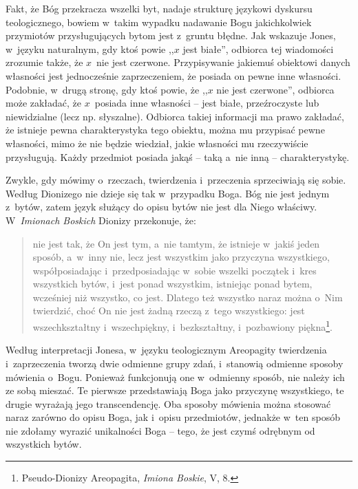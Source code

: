 Fakt, że Bóg przekracza wszelki byt, nadaje strukturę językowi dyskursu teologicznego, bowiem w~takim wypadku nadawanie Bogu jakichkolwiek przymiotów przysługujących bytom jest z~gruntu błędne. Jak wskazuje Jones, w~języku naturalnym, gdy ktoś powie ,,$x$ jest białe'', odbiorca tej wiadomości zrozumie także, że $x$~nie jest czerwone. Przypisywanie jakiemuś obiektowi danych własności jest jednocześnie zaprzeczeniem, że posiada on pewne inne własności. Podobnie, w~drugą stronę, gdy ktoś powie, że ,,$x$ nie jest czerwone'', odbiorca może zakładać, że $x$~posiada inne własności -- jest białe, przeźroczyste lub niewidzialne (lecz np. słyszalne). Odbiorca takiej informacji ma prawo zakładać, że istnieje pewna charakterystyka tego obiektu, można mu przypisać pewne własności, mimo że nie będzie wiedział, jakie własności mu rzeczywiście przysługują. Każdy przedmiot posiada jakąś -- taką a~nie inną -- charakterystykę.

Zwykle, gdy mówimy o~rzeczach, twierdzenia i~przeczenia sprzeciwiają się sobie. Według Dionizego nie dzieje się tak w~przypadku Boga. Bóg nie jest jednym z~bytów, zatem język służący do opisu bytów nie jest dla Niego właściwy. W~\textit{Imionach Boskich} Dionizy przekonuje, że:

\begin{quote}
nie jest tak, że On jest tym, a~nie tamtym, że istnieje w~jakiś jeden sposób, a~w~inny nie, lecz jest wszystkim jako przyczyna wszystkiego, współposiadając i~przedposiadając w~sobie wszelki początek i~kres wszystkich bytów, i~jest ponad wszystkim, istniejąc ponad bytem, wcześniej niż wszystko, co jest. Dlatego też wszystko naraz można o~Nim twierdzić, choć On nie jest żadną rzeczą z~tego wszystkiego: jest wszechkształtny i~wszechpiękny, i~bezkształtny, i~pozbawiony piękna\footnote{Pseudo-Dionizy Areopagita, \textit{Imiona Boskie}, V, 8.}.
\end{quote}

Według interpretacji Jonesa, w~języku teologicznym Areopagity twierdzenia i~zaprzeczenia tworzą dwie odmienne grupy zdań, i~stanowią odmienne sposoby mówienia o~Bogu. Ponieważ funkcjonują one w~odmienny sposób, nie należy ich ze sobą mieszać. Te pierwsze przedstawiają Boga jako przyczynę wszystkiego, te drugie wyrażają jego transcendencję. Oba sposoby mówienia można stosować naraz zarówno do opisu Boga, jak i~opisu przedmiotów, jednakże w~ten sposób nie zdołamy wyrazić unikalności Boga -- tego, że jest czymś odrębnym od wszystkich bytów.


